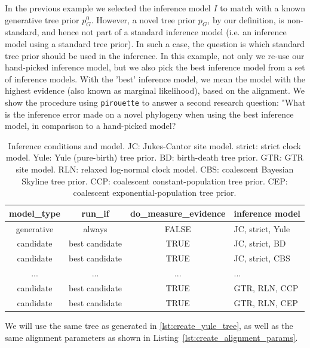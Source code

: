 In the previous example we selected the inference model $\mathit{I}$ to match 
with a known generative tree prior $\mathit{p_{G}^0}$.
However, a novel tree prior $\mathit{p_{G}}$, by our definition, is 
non-standard, and hence not part of a standard inference 
model (i.e. an inference model using a standard tree prior).
In such a case, the question is which standard tree prior should be used in 
the inference. In this example, not only we re-use our hand-picked 
inference model, but we also pick the best inference model from a set of 
inference models. With the 'best' inference model, we mean the model with 
the highest evidence (also known as marginal likelihood), based on the 
alignment. We show the procedure using \verb;pirouette; to answer a second 
research question: "What is the inference error made on a novel phylogeny when using the best inference model, in comparison to a hand-picked model?

\begin{table}
  \begin{tabular}{ | c | c | c | l | }
    \hline
    \textbf{model\_type} &
    \textbf{run\_if} &
    \textbf{do\_measure\_evidence} & 
    \textbf{inference model} \\ 
    \hline
    generative & always         & FALSE & JC, strict, Yule \\
    candidate  & best candidate & TRUE  & JC, strict, BD   \\
    candidate  & best candidate & TRUE  & JC, strict, CBS  \\
    ...        & ...            & ...   & ...              \\
    candidate  & best candidate & TRUE  & GTR, RLN, CCP    \\
    candidate  & best candidate & TRUE  & GTR, RLN, CEP    \\
    \hline
  \end{tabular}
  \caption{
    Inference conditions and model.
    JC: Jukes-Cantor site model.
    strict: strict clock model.
    Yule: Yule (pure-birth) tree prior.
    BD: birth-death tree prior.
    GTR: GTR site model.
    RLN: relaxed log-normal clock model.
    CBS: coalescent Bayesian Skyline tree prior.
    CCP: coalescent constant-population tree prior.
    CEP: coalescent exponential-population tree prior.
  }
  \label{tab:RQ2}
\end{table}

We will use the same tree as generated in \ref{lst:create_yule_tree}, as well 
as the same alignment parameters as shown 
in Listing~\ref{lst:create_alignment_params}.

